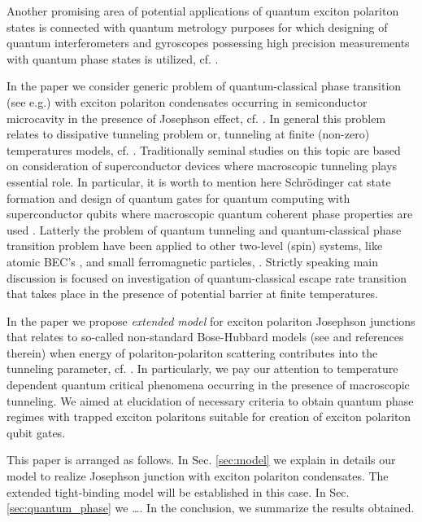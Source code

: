 \documentclass[aps, pre, preprint, groupedaddress, superscriptaddress, showkeys, showpacs] {revtex4-1}
\begin{document}
Another promising area of potential applications of quantum exciton polariton states is connected with quantum metrology purposes for which designing of quantum interferometers and gyroscopes possessing high precision measurements with quantum phase states is utilized, cf. \cite{Pezze, Gulevich}.
  
In the paper we consider generic problem  of quantum-classical phase transition (see e.g.\cite{Chudnovsky_1997}) with exciton polariton condensates occurring in semiconductor microcavity in the presence of Josephson effect, cf. \cite{Aleiner, Shelykh_2008, Borgh_2010}.
In general this problem relates to dissipative tunneling problem or, tunneling at finite (non-zero) temperatures models, cf. \cite{Caldeira, Larkin, Riseborough}.
Traditionally  seminal studies on this topic are based on consideration of superconductor devices \cite{Ankerhold} where macroscopic tunneling plays essential role.
In particular, it is worth to mention here Schr\"odinger cat state formation \cite{Leggett} and design of quantum gates for quantum computing with superconductor qubits where macroscopic quantum coherent phase properties are used \cite{Makhlin}.
Latterly the problem of quantum tunneling and quantum-classical phase transition problem have been applied to other two-level (spin) systems, like atomic BEC's \cite{Zhang}, and small ferromagnetic particles, \cite{Owerre}.
Strictly speaking main discussion is focused on investigation of quantum-classical escape rate transition that takes place in the presence of potential barrier at finite temperatures.
  
In the paper we propose \textit{extended model} for exciton polariton Josephson junctions that relates to so-called non-standard Bose-Hubbard models (see \cite{Dutta} and references therein) when energy of polariton-polariton scattering contributes into the tunneling parameter, cf. \cite{Aleiner, Shelykh_2008, Borgh_2010, Solnyshkov_2008, Sarchi}.
In particularly, we pay our attention to temperature dependent quantum critical phenomena occurring in the presence of macroscopic tunneling.
We aimed at elucidation of necessary criteria to obtain quantum phase regimes with trapped exciton polaritons suitable for creation of exciton polariton qubit gates.

This paper is arranged as follows.
In Sec. \ref{sec:model} we explain in details our model to realize Josephson junction with exciton polariton condensates.
The extended tight-binding model will be established in this case.
In Sec. \ref{sec:quantum_phase} we {\red \dots }.
In the conclusion, we summarize the results obtained.
\end{document}
